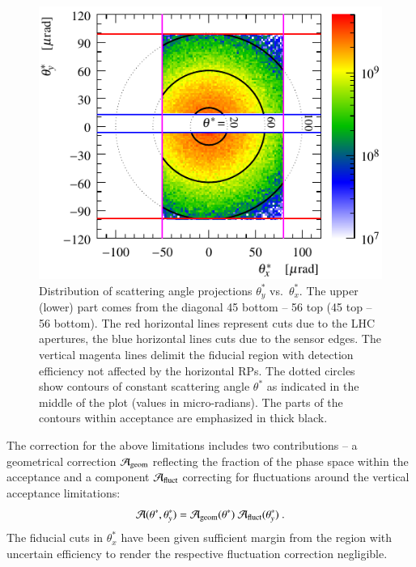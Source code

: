 \begin{figure}
\begin{center}
\includegraphics{fig/acc_corr_phi_lab.pdf}
\caption{%
Distribution of scattering angle projections $\theta_y^*$ vs.~$\theta_x^*$. The upper (lower) part comes from the diagonal 45 bottom -- 56 top (45 top -- 56 bottom). The red horizontal lines represent cuts due to the LHC apertures, the blue horizontal lines cuts due to the sensor edges. The vertical magenta lines delimit the fiducial region with detection efficiency not affected by the horizontal RPs. The dotted circles show contours of constant scattering angle $\theta^*$ as indicated in the middle of the plot (values in micro-radians). The parts of the contours within acceptance are emphasized in thick black.
}
\label{fig:acc corr princ}
\end{center}
\end{figure}

The correction for the above limitations includes two contributions -- a geometrical correction ${\cal A}_{\rm geom}$ reflecting the fraction of the phase space within the acceptance and a component ${\cal A}_{\rm fluct}$ correcting for fluctuations around the vertical acceptance limitations:
\begin{equation}
{\cal A}(\theta^*, \theta_y^*) = {\cal A}_{\rm geom}(\theta^*)\ {\cal A}_{\rm fluct}(\theta_y^*)\ .
\end{equation}
The fiducial cuts in $\theta_x^*$ have been given sufficient margin from the region with uncertain efficiency to render the respective fluctuation correction negligible.

